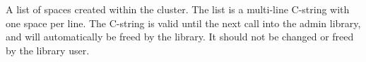 A list of spaces created within the cluster.  The list is a multi-line C-string
with one space per line.  The C-string is valid until the next call into the
admin library, and will automatically be freed by the library.  It should not be
changed or freed by the library user.
